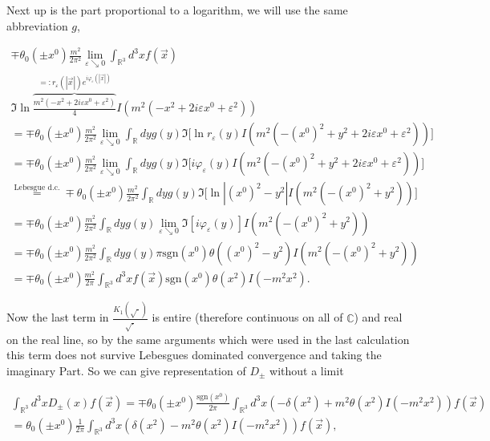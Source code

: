 \documentclass[a4paper,11pt]{article}
\begin{document}
Next up is the part proportional to a logarithm, we will use the same abbreviation \(g\),

\begin{align}
\mp \theta_0(\pm x^0) \frac{m^2}{2\pi^2} \lim_{\varepsilon \searrow 0} \int_{\mathbb{R}^3} d^3x f(\vec{x})~~~~~~~~~~~~~~~~~~~~~~~~~~~~~~~~~~~~~~~~~~~~~~~~~~~~\\
 \Im \ln \overbrace{\frac{m^2(-x^2+2i\varepsilon x^0 + \varepsilon^2)}{4} }^{=: r_\varepsilon (|\vec{x}|)e^{i \varphi_\varepsilon (|\vec{x}|)}}I(m^2 (-x^2+2i\varepsilon x^0 + \varepsilon^2))\\
=\mp \theta_0(\pm x^0) \frac{m^2}{2\pi^2} \lim_{\varepsilon \searrow 0} \int_\mathbb{R} dy g(y) \Im \Big[\ln r_\varepsilon(y)
I(m^2 (-(x^0)^2 + y^2+2i\varepsilon x^0 + \varepsilon^2))\Big]\\
=\mp \theta_0(\pm x^0) \frac{m^2}{2\pi^2} \lim_{\varepsilon \searrow 0} \int_\mathbb{R} dy g(y) \Im\Big[ i \varphi_\varepsilon(y)
 I(m^2 (-(x^0)^2 + y^2+2i\varepsilon x^0 + \varepsilon^2))\Big]\\
 \overset{\text{Lebesgue d.c.}}{=}\mp \theta_0(\pm x^0) \frac{m^2}{2\pi^2}  \int_\mathbb{R} dy g(y) \Im \Big[\ln |(x^0)^2-y^2|
I(m^2 (-(x^0)^2 + y^2))\Big]\\
=\mp \theta_0(\pm x^0) \frac{m^2}{2\pi^2}  \int_\mathbb{R} dy g(y)\lim_{\varepsilon \searrow 0} \Im[ i \varphi_\varepsilon(y)]
 I(m^2 (-(x^0)^2 + y^2))\\
 =\mp \theta_0(\pm x^0) \frac{m^2}{2\pi^2}  \int_\mathbb{R} dy g(y) \pi \text{sgn}(x^0) \theta((x^0)^2-y^2)
 I(m^2 (-(x^0)^2 + y^2))\\
 = \mp \theta_0(\pm x^0) \frac{ m^2}{2\pi} \int_{\mathbb{R}^3} d^3 x f(\vec{x}) \text{sgn}(x^0) \theta(x^2) I(-m^2x^2).
\end{align}

Now the last term in \(\frac{K_1(\sqrt{\cdot})}{\sqrt{\cdot}}\) is entire (therefore continuous on all of \(\mathbb{C}\)) 
and real on the real line, so by the same arguments which were used
in the last calculation this term does not survive Lebesgues dominated convergence and taking the imaginary Part. 
So we can give representation of \(D_\pm\) without a limit

\begin{align}
\int_{\mathbb{R}^3}d^3 x D_\pm (x) f(\vec{x}) = \mp \theta_0(\pm x^0)\frac{\text{sgn}(x^0)}{2\pi} \int_{\mathbb{R}^3}d^3 x (- \delta(x^2)+m^2 \theta(x^2) I(-m^2x^2))f(\vec{x})\\
= \theta_0(\pm x^0)\frac{1 }{2\pi} \int_{\mathbb{R}^3}d^3 x ( \delta(x^2)-m^2 \theta(x^2) I(-m^2x^2))f(\vec{x}),
\end{align}
\end{document}

